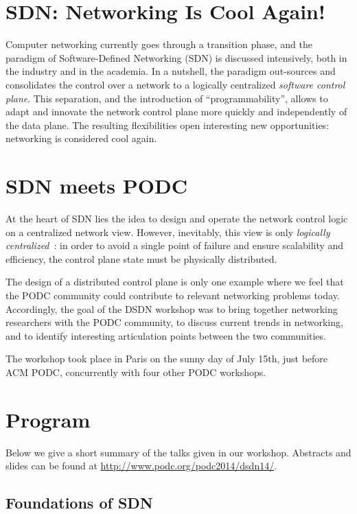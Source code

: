 \documentclass[11pt,pdftex,letter]{article}
\begin{document}
\section{SDN: Networking Is Cool Again!}

Computer networking currently goes through a transition phase,
and the paradigm of Software-Defined Networking (SDN)
is discussed intensively, both in the industry and in the academia. In
a nutshell, the paradigm out-sources and consolidates the control over a network
to a logically centralized \emph{software control plane}.
This separation, and the introduction of ``programmability'',
allows to adapt and innovate the network control plane more quickly
and independently of the data plane.
The resulting flexibilities open interesting new opportunities:
networking is considered cool again.

\section{SDN meets PODC}

At the heart of SDN lies the idea to design and operate
the network control logic
on a centralized network view.
However, inevitably, this view is only \emph{logically centralized}~\cite{onix}:
in order to avoid a single point of failure and ensure scalability and efficiency,
the control plane state must
be physically distributed.

The design of a distributed control plane is only one example where we feel that the
PODC community could contribute to relevant networking problems today.
Accordingly, the goal of the DSDN workshop was to bring together networking researchers with the PODC
community, to discuss current trends in networking, and to identify interesting articulation
points between the two communities.

The workshop took
place in Paris on the sunny day of July 15th, just before
ACM PODC, concurrently with four other PODC workshops.

\section{Program}

Below we give a short summary of the talks given in our
workshop. Abstracts and slides can be found at \url{http://www.podc.org/podc2014/dsdn14/}.

\subsection{Foundations of SDN}
\end{document}
